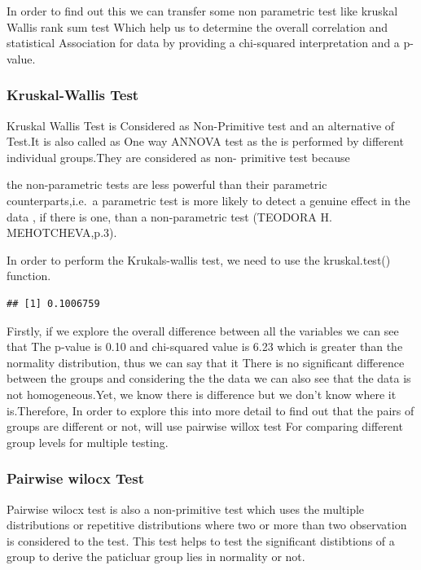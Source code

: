 \documentclass[
]{article}
\begin{document}
In order to find out this we can transfer some non parametric test like
kruskal Wallis rank sum test Which help us to determine the overall
correlation and statistical Association for data by providing a
chi-squared interpretation and a p-value.

\hypertarget{kruskal-wallis-test}{%
\subsubsection{Kruskal-Wallis Test}\label{kruskal-wallis-test}}

Kruskal Wallis Test is Considered as Non-Primitive test and an
alternative of Test.It is also called as One way ANNOVA test as the is
performed by different individual groups.They are considered as non-
primitive test because

the non-parametric tests are less powerful than their parametric
counterparts,i.e.~a parametric test is more likely to detect a genuine
effect in the data , if there is one, than a non-parametric test
(TEODORA H. MEHOTCHEVA,p.3).

In order to perform the Krukals-wallis test, we need to use the
kruskal.test() function.

\begin{verbatim}
## [1] 0.1006759
\end{verbatim}

Firstly, if we explore the overall difference between all the variables
we can see that The p-value is 0.10 and chi-squared value is 6.23 which
is greater than the normality distribution, thus we can say that it
There is no significant difference between the groups and considering
the the data we can also see that the data is not homogeneous.Yet, we
know there is difference but we don't know where it is.Therefore, In
order to explore this into more detail to find out that the pairs of
groups are different or not, will use pairwise willox test For comparing
different group levels for multiple testing.

\hypertarget{pairwise-wilocx-test}{%
\subsubsection{Pairwise wilocx Test}\label{pairwise-wilocx-test}}

Pairwise wilocx test is also a non-primitive test which uses the
multiple distributions or repetitive distributions where two or more
than two observation is considered to the test. This test helps to test
the significant distibtions of a group to derive the paticluar group
lies in normality or not.
\end{document}
